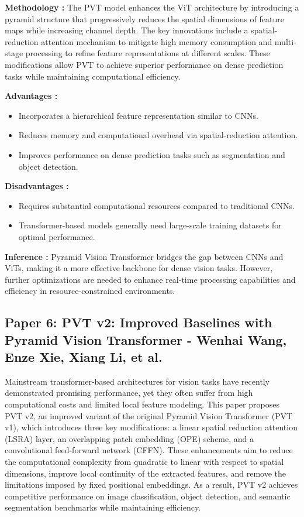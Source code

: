 \documentclass[11pt]{report}
\begin{document}
\textbf{Methodology : }
The PVT model enhances the ViT architecture by introducing a pyramid structure that progressively reduces the spatial dimensions of feature maps while increasing channel depth. The key innovations include a spatial-reduction attention mechanism to mitigate high memory consumption and multi-stage processing to refine feature representations at different scales. These modifications allow PVT to achieve superior performance on dense prediction tasks while maintaining computational efficiency.

\textbf{Advantages : }  
\begin{itemize}
    \item Incorporates a hierarchical feature representation similar to CNNs.
    \item Reduces memory and computational overhead via spatial-reduction attention.
    \item Improves performance on dense prediction tasks such as segmentation and object detection.
\end{itemize}

\textbf{Disadvantages : }
\begin{itemize}
    \item Requires substantial computational resources compared to traditional CNNs.
    \item Transformer-based models generally need large-scale training datasets for optimal performance.
\end{itemize}

\textbf{Inference : }
Pyramid Vision Transformer bridges the gap between CNNs and ViTs, making it a more effective backbone for dense vision tasks. However, further optimizations are needed to enhance real-time processing capabilities and efficiency in resource-constrained environments.

\subsection{Paper 6: PVT v2: Improved Baselines with Pyramid Vision Transformer - Wenhai Wang, Enze Xie, Xiang Li, et al.}

Mainstream transformer-based architectures for vision tasks have recently demonstrated promising performance, yet they often suffer from high computational costs and limited local feature modeling. This paper proposes PVT v2, an improved variant of the original Pyramid Vision Transformer (PVT v1), which introduces three key modifications: a linear spatial reduction attention (LSRA) layer, an overlapping patch embedding (OPE) scheme, and a convolutional feed-forward network (CFFN). These enhancements aim to reduce the computational complexity from quadratic to linear with respect to spatial dimensions, improve local continuity of the extracted features, and remove the limitations imposed by fixed positional embeddings. As a result, PVT v2 achieves competitive performance on image classification, object detection, and semantic segmentation benchmarks while maintaining efficiency.
\end{document}
